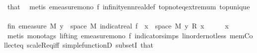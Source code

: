 \begin{isabellebody}
\ that\ \isamarkupfalse%
\ {\isacharparenleft}{\kern0pt}metis\ emeasure{\isacharunderscore}{\kern0pt}mono\ f{\isacharparenleft}{\kern0pt}{}{\isacharparenright}{\kern0pt}\ infinity{\isacharunderscore}{\kern0pt}ennreal{\isacharunderscore}{\kern0pt}def\ top{\isachardot}{\kern0pt}not{\isacharunderscore}{\kern0pt}eq{\isacharunderscore}{\kern0pt}extremum\ top{\isacharunderscore}{\kern0pt}unique{\isacharparenright}{\kern0pt}\isanewline
\ \ \ \ \isamarkupfalse%
\ fin{\isacharunderscore}{\kern0pt}{}{\isacharcolon}{\kern0pt}\ {\isachardoublequoteopen}emeasure\ M\ {\isacharbraceleft}{\kern0pt}y\ {\isasymin}\ space\ M{\isachardot}{\kern0pt}\ indicat{\isacharunderscore}{\kern0pt}real\ {\isacharparenleft}{\kern0pt}f\ {\isacharminus}{\kern0pt}{\isacharbackquote}{\kern0pt}\ {\isacharbraceleft}{\kern0pt}x{\isacharbraceright}{\kern0pt}\ {\isasyminter}\ space\ M{\isacharparenright}{\kern0pt}\ y\ {\isacharasterisk}{\kern0pt}\isactrlsub R\ x\ {\isasymnoteq}\ {}{\isacharbraceright}{\kern0pt}\ {\isasymnoteq}\ {\isasyminfinity}{\isachardoublequoteclose}\ \ {\isachardoublequoteopen}x\ {\isasymnoteq}\ {}{\isachardoublequoteclose}\ \isamarkupfalse%
\ {\isacharparenleft}{\kern0pt}metis\ {\isacharparenleft}{\kern0pt}mono{\isacharunderscore}{\kern0pt}tags{\isacharcomma}{\kern0pt}\ lifting{\isacharparenright}{\kern0pt}\ emeasure{\isacharunderscore}{\kern0pt}mono\ f{\isacharparenleft}{\kern0pt}{}{\isacharparenright}{\kern0pt}\ indicator{\isacharunderscore}{\kern0pt}simps{\isacharparenleft}{\kern0pt}{}{\isacharparenright}{\kern0pt}\ linorder{\isacharunderscore}{\kern0pt}not{\isacharunderscore}{\kern0pt}less\ mem{\isacharunderscore}{\kern0pt}Collect{\isacharunderscore}{\kern0pt}eq\ scaleR{\isacharunderscore}{\kern0pt}eq{\isacharunderscore}{\kern0pt}{}{\isacharunderscore}{\kern0pt}iff\ simple{\isacharunderscore}{\kern0pt}functionD{\isacharparenleft}{\kern0pt}{}{\isacharparenright}{\kern0pt}\ subsetI\ that{\isacharparenright}{\kern0pt}\isanewline
\isanewline
\ \ \ \ \isamarkupfalse%

\end{isabellebody}
